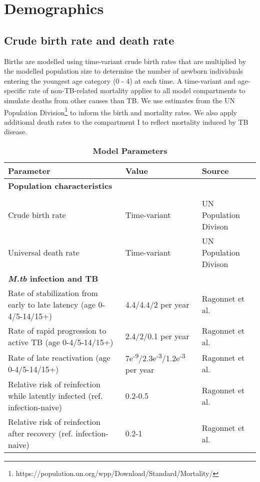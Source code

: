 

\section{Demographics}
\subsection{Crude birth rate and death rate}
Births are modelled using time-variant crude birth rates that are multiplied by the modelled population 
size to determine the number of newborn individuals entering the youngest age category (0 - 4) at each time. A time-variant 
and age-specific rate of non-TB-related mortality applies to all model compartments to simulate 
deaths from other causes than TB. We use estimates from the UN Population Division\footnote{https://population.un.org/wpp/Download/Standard/Mortality/} to inform the 
birth and mortality rates.
We also apply additional death rates to the compartment I to reflect mortality induced by TB 
disease.
\begin{table}[!htp]
    \caption{\textbf{Model Parameters}}
    \label{tab:parameter}
    \begin{threeparttable}
    \begin{tabularx}{\textwidth}{ X  X  X }
        \hline
        \textbf{Parameter} & \textbf{Value} & \textbf{Source} \\
        \hline
        \textbf{Population characteristics} & & \\
          \\
        Crude birth rate  & Time-variant & UN Population Divison \\
        Universal death rate & Time-variant & UN Population Divison \\
        \hline
        \textbf{\emph{M.tb} infection and TB} \\
        Rate of stabilization from early to late latency (age 0-4/5-14/15+) & 4.4/4.4/2 per year & Ragonnet et al.\cite{ragonnet-2022} \\
        Rate of rapid progression to active TB (age 0-4/5-14/15+) & 2.4/2/0.1 per year & Ragonnet et al.\cite{ragonnet-2022} \\
        Rate of late reactivation (age 0-4/5-14/15+) & 7e\textsuperscript{-9}/2.3e\textsuperscript{-3}/1.2e\textsuperscript{-3} per year & Ragonnet et al.\cite{ragonnet-2022} \\
        Relative risk of reinfection while latently infected (ref. infection-naive) & 0.2-0.5 & Ragonnet et al.\cite{ragonnet-2022} \\
        Relative risk of reinfection after recovery (ref. infection-naive) & 0.2-1 & Ragonnet et al.\cite{ragonnet-2022} \\
        \hline
	\end{tabularx}
    \end{threeparttable}
\end{table}
